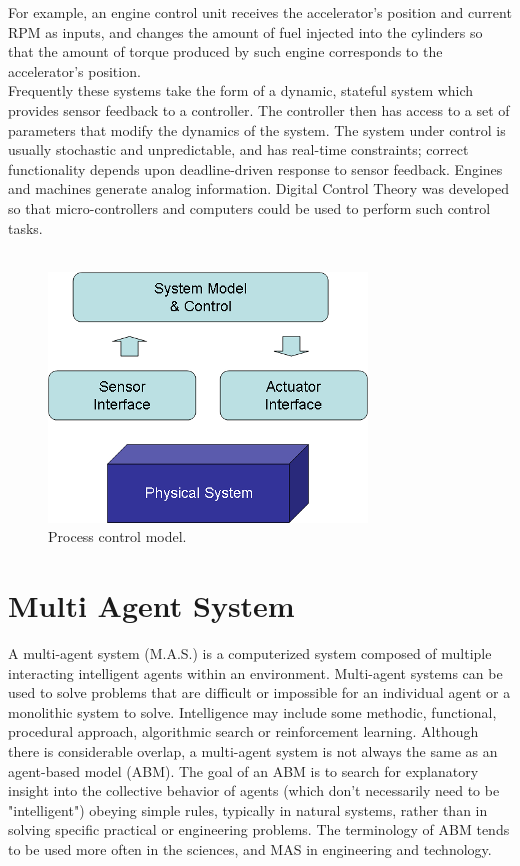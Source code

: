 \documentclass{article}
\begin{document}
\noindent For example, an engine control unit receives the accelerator's position and current RPM as inputs, and changes the amount of fuel injected into the cylinders so that the amount of torque produced by such engine corresponds to the accelerator's position.\\

\noindent Frequently these systems take the form of a dynamic, stateful system which provides sensor feedback to a controller. The controller then has access to a set of parameters that modify the dynamics of the system. The system under control is usually stochastic and unpredictable, and has real-time constraints; correct functionality depends upon deadline-driven response to sensor feedback. Engines and machines generate analog information. Digital Control Theory was developed so that micro-controllers and computers could be used to perform such control tasks.\\\\


\begin{figure}[h]
\centering
\includegraphics[scale=0.8]{pc.png}
\caption{Process control model.}
\label{fig_pc}
\end{figure}
	



\section{Multi Agent System}
A multi-agent system (M.A.S.) is a computerized system composed of multiple interacting intelligent agents within an environment. Multi-agent systems can be used to solve problems that are difficult or impossible for an individual agent or a monolithic system to solve. Intelligence may include some methodic, functional, procedural approach, algorithmic search or reinforcement learning. Although there is considerable overlap, a multi-agent system is not always the same as an agent-based model (ABM). The goal of an ABM is to search for explanatory insight into the collective behavior of agents (which don't necessarily need to be "intelligent") obeying simple rules, typically in natural systems, rather than in solving specific practical or engineering problems. The terminology of ABM tends to be used more often in the sciences, and MAS in engineering and technology.\\\\
\end{document}
